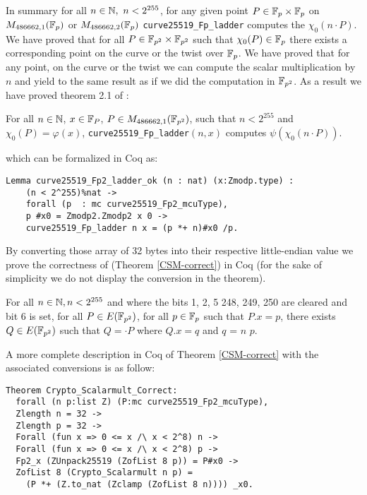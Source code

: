 In summary for all $n \in \mathbb{N},\ n < 2^{255}$, for any given point $P\in\mathbb{F}_{p}\times\mathbb{F}_{p}$ on $M_{486662,1}(\mathbb{F}_{p})$ or $M_{486662,2}(\mathbb{F}_{p})$ \texttt{curve25519\_Fp\_ladder} computes the $\chi_0(n \cdot P)$.
We have proved that for all $P \in \mathbb{F}_{p^2}\times\mathbb{F}_{p^2}$ such that $\chi_0(P) \in \mathbb{F}_{p}$ there exists a corresponding point on the curve or the twist over $\mathbb{F}_{p}$.
We have proved that for any point, on the curve or the twist we can compute the scalar multiplication by $n$ and yield to the same result as if we did the computation in $\mathbb{F}_{p^2}$. As a result we have proved theorem 2.1 of \cite{Ber06}:
\begin{theorem}
For all $n \in \mathbb{N}$, $x \in \mathbb{F}_{P}$, $P \in M_{486662,1}(\mathbb{F}_{p^2})$, such that $n < 2^{255}$ and $\chi_0(P) = \varphi(x)$, \texttt{curve25519\_Fp\_ladder}$(n, x)$ computes $\psi(\chi_0(n \cdot P))$.
\end{theorem}
which can be formalized in Coq as:
\begin{lstlisting}[language=Coq]
Lemma curve25519_Fp2_ladder_ok (n : nat) (x:Zmodp.type) :
    (n < 2^255)%nat ->
    forall (p  : mc curve25519_Fp2_mcuType),
    p #x0 = Zmodp2.Zmodp2 x 0 ->
    curve25519_Fp_ladder n x = (p *+ n)#x0 /p.
\end{lstlisting}





By converting those array of 32 bytes into their respective little-endian value
we prove the correctness of  (Theorem \ref{CSM-correct})
in Coq (for the sake of simplicity we do not display the conversion in the theorem).
\begin{theorem}
\label{CSM-correct}
For all $n \in \mathbb{N}, n < 2^{255}$ and where the bits 1, 2, 5 248, 249, 250
are cleared and bit 6 is set, for all $P \in E(\mathbb{F}_{p^2})$,
for all $p \in \mathbb{F}_{p}$ such that $P.x = p$,
there exists $Q \in E(\mathbb{F}_{p^2})$ such that $Q = \cdot P$ where $Q.x = q$ and $q$ =  $n$ $p$.
\end{theorem}
A more complete description in Coq of Theorem \ref{CSM-correct} with the associated conversions
is as follow:
\begin{lstlisting}[language=Coq]
Theorem Crypto_Scalarmult_Correct:
  forall (n p:list Z) (P:mc curve25519_Fp2_mcuType),
  Zlength n = 32 ->
  Zlength p = 32 ->
  Forall (fun x => 0 <= x /\ x < 2^8) n ->
  Forall (fun x => 0 <= x /\ x < 2^8) p ->
  Fp2_x (ZUnpack25519 (ZofList 8 p)) = P#x0 ->
  ZofList 8 (Crypto_Scalarmult n p) =
    (P *+ (Z.to_nat (Zclamp (ZofList 8 n)))) _x0.
\end{lstlisting}
